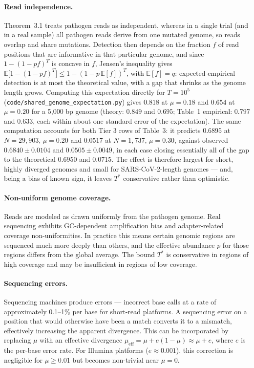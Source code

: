 \documentclass[12pt]{article}
\theoremstyle{definition}
\theoremstyle{plain}
\newcommand{\E}{\mathbb{E}}
\begin{document}
\paragraph{Read independence.} Theorem~3.1 treats pathogen reads as
independent, whereas in a single trial (and in a real sample) all pathogen
reads derive from one mutated genome, so reads overlap and share mutations.
Detection then depends on the fraction $f$ of read positions that are
informative in that particular genome, and since $1-(1-pf)^{T}$ is concave in
$f$, Jensen's inequality gives
$\E\bigl[1-(1-pf)^{T}\bigr]\le1-(1-p\,\E[f])^{T}$, with $\E[f]=q$:
expected empirical detection is at most the theoretical value, with a gap
that shrinks as the genome length grows. Computing this expectation directly
for $T=10^{5}$ (\texttt{code/shared\_genome\_expectation.py}) gives $0.818$
at $\mu=0.18$ and $0.654$ at $\mu=0.20$ for a 5,000 bp genome (theory:
$0.849$ and $0.695$; Table~1 empirical: $0.797$ and $0.633$, each within
about one standard error of the expectation). The same computation accounts
for both Tier 3 rows of Table~3: it predicts $0.6895$ at $N=29{,}903$,
$\mu=0.20$ and $0.0517$ at $N=1{,}737$, $\mu=0.30$, against observed
$0.6840\pm0.0104$ and $0.0505\pm0.0049$, in each case closing essentially
all of the gap to the theoretical $0.6950$ and $0.0715$. The effect is
therefore largest for short, highly diverged genomes and small for
SARS-CoV-2-length genomes --- and, being a bias of known sign, it leaves
$T^{*}$ conservative rather than optimistic.

\paragraph{Non-uniform genome coverage.} Reads are modeled as drawn uniformly
from the pathogen genome. Real sequencing exhibits GC-dependent amplification
bias and adapter-related coverage non-uniformities. In practice this means
certain genomic regions are sequenced much more deeply than others, and the
effective abundance $p$ for those regions differs from the global average.
The bound $T^{*}$ is conservative in regions of high coverage and may be
insufficient in regions of low coverage.

\paragraph{Sequencing errors.} Sequencing machines produce errors ---
incorrect base calls at a rate of approximately 0.1--1\% per base for
short-read platforms. A sequencing error on a position that would otherwise
have been a match converts it to a mismatch, effectively increasing the
apparent divergence. This can be incorporated by replacing $\mu$ with an
effective divergence $\mu_{\mathrm{eff}}=\mu+e(1-\mu)\approx\mu+e$, where
$e$ is the per-base error rate. For Illumina platforms ($e\approx0.001$),
this correction is negligible for $\mu\ge0.01$ but becomes non-trivial near
$\mu=0$.
\end{document}
